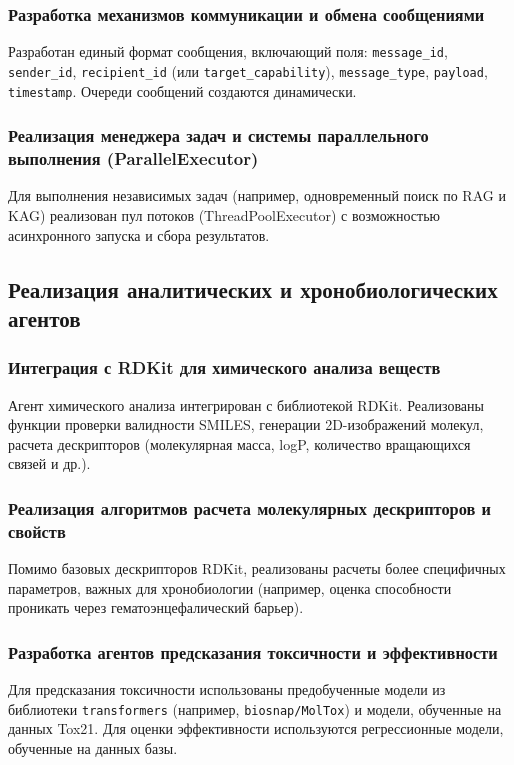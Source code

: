 \documentclass[a4paper,14pt]{extarticle}
\begin{document}
	\subsubsection{Разработка механизмов коммуникации и обмена сообщениями}
	Разработан единый формат сообщения, включающий поля: \texttt{message\_id}, \texttt{sender\_id}, \texttt{recipient\_id} (или \texttt{target\_capability}), \texttt{message\_type}, \texttt{payload}, \texttt{timestamp}. Очереди сообщений создаются динамически.
	
	\subsubsection{Реализация менеджера задач и системы параллельного выполнения (ParallelExecutor)}
	Для выполнения независимых задач (например, одновременный поиск по RAG и KAG) реализован пул потоков (ThreadPoolExecutor) с возможностью асинхронного запуска и сбора результатов.
	
	\subsection{Реализация аналитических и хронобиологических агентов}
	
	\subsubsection{Интеграция с RDKit для химического анализа веществ}
	Агент химического анализа интегрирован с библиотекой RDKit. Реализованы функции проверки валидности SMILES, генерации 2D-изображений молекул, расчета дескрипторов (молекулярная масса, logP, количество вращающихся связей и др.).
	
	\subsubsection{Реализация алгоритмов расчета молекулярных дескрипторов и свойств}
	Помимо базовых дескрипторов RDKit, реализованы расчеты более специфичных параметров, важных для хронобиологии (например, оценка способности проникать через гематоэнцефалический барьер).
	
	\subsubsection{Разработка агентов предсказания токсичности и эффективности}
	Для предсказания токсичности использованы предобученные модели из библиотеки \texttt{transformers} (например, \texttt{biosnap/MolTox}) и модели, обученные на данных Tox21. Для оценки эффективности используются регрессионные модели, обученные на данных базы.
	
\end{document}
